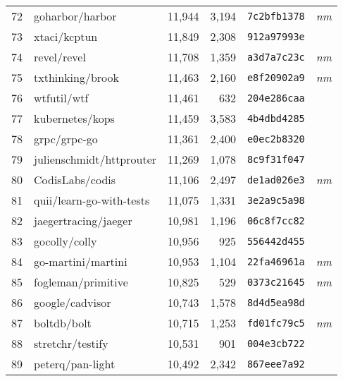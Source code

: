 {\begin{supertabular}{llrrll}
        72  &                    goharbor/harbor & 11,944 &  3,194 &  \texttt{7c2bfb1378} &  \textit{nm} \\
        73  &                       xtaci/kcptun & 11,849 &  2,308 &  \texttt{912a97993e} &              \\
        74  &                        revel/revel & 11,708 &  1,359 &  \texttt{a3d7a7c23c} &  \textit{nm} \\
        75  &                   txthinking/brook & 11,463 &  2,160 &  \texttt{e8f20902a9} &  \textit{nm} \\
        76  &                        wtfutil/wtf & 11,461 &    632 &  \texttt{204e286caa} &              \\
        77  &                    kubernetes/kops & 11,459 &  3,583 &  \texttt{4b4dbd4285} &              \\
        78  &                       grpc/grpc-go & 11,361 &  2,400 &  \texttt{e0ec2b8320} &              \\
        79  &           julienschmidt/httprouter & 11,269 &  1,078 &  \texttt{8c9f31f047} &              \\
        80  &                    CodisLabs/codis & 11,106 &  2,497 &  \texttt{de1ad026e3} &  \textit{nm} \\
        81  &           quii/learn-go-with-tests & 11,075 &  1,331 &  \texttt{3e2a9c5a98} &              \\
        82  &               jaegertracing/jaeger & 10,981 &  1,196 &  \texttt{06c8f7cc82} &              \\
        83  &                      gocolly/colly & 10,956 &    925 &  \texttt{556442d455} &              \\
        84  &                 go-martini/martini & 10,953 &  1,104 &  \texttt{22fa46961a} &  \textit{nm} \\
        85  &                 fogleman/primitive & 10,825 &    529 &  \texttt{0373c21645} &  \textit{nm} \\
        86  &                    google/cadvisor & 10,743 &  1,578 &  \texttt{8d4d5ea98d} &              \\
        87  &                        boltdb/bolt & 10,715 &  1,253 &  \texttt{fd01fc79c5} &  \textit{nm} \\
        88  &                   stretchr/testify & 10,531 &    901 &  \texttt{004e3cb722} &              \\
        89  &                   peterq/pan-light & 10,492 &  2,342 &  \texttt{867eee7a92} &              \\

\end{supertabular}}
